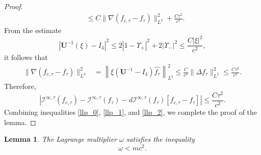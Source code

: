 \documentclass{amsart}
\theoremstyle{plain}
\newtheorem{lemma}[theorem]{Lemma}
\theoremstyle{definition}
\theoremstyle{remark}
\numberwithin{equation}{section} \numberwithin{figure}{section}
\begin{document}
\begin{proof}
\begin{equation}
\begin{aligned}
        &\leq C \| \nabla(f_{c,\tau} - f_\tau) \|_{L^2}^2 + \frac{C\tau^2}{c^2}.
        \end{aligned}
        \end{equation}
        From the estimate
        \[
        |\mathbf{U}^{-1}(\xi) - I_4|^2 \leq 2|1 - \Upsilon_+|^2 + 2|\Upsilon_-|^2 \leq \frac{C|\xi|^2}{c^2},
        \]
        it follows that
        \begin{equation*}
        \begin{aligned}
        \| \nabla(f_{c,\tau} - f_\tau) \|_{L^2}^2 &= \left\| \xi (\mathbf{U}^{-1} - I_4) \widehat{f_\tau} \right\|_{L^2}^2 \leq \frac{C}{c^2} \| \Delta f_\tau \|_{L^2}^2 \leq \frac{C\tau^2}{c^2}.
        \end{aligned}
        \end{equation*}
        Therefore,
        \begin{equation}\label{llp_2}
        \left| \mathcal{I}^{\infty,\tau}(f_{c,\tau}) - \mathcal{I}^{\infty,\tau}(f_\tau) - d\mathcal{I}^{\infty,\tau}(f_\tau)[f_{c,\tau} - f_\tau] \right| \leq \frac{C\tau^2}{c^2}.
        \end{equation}
        Combining inequalities \eqref{llp_0}, \eqref{llp_1}, and \eqref{llp_2}, we complete the proof of the lemma.
        \end{proof}
        
       
  











        \begin{lemma}\label{stb_8}
          The Lagrange multiplier $\omega$ satisfies the inequality
          \[
          \omega < mc^2.
          \]
          \end{lemma}
          
\end{document}
